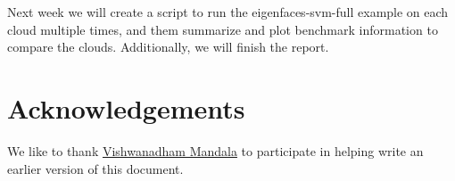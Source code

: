 Next week we will create a script to run the eigenfaces-svm-full example
on each cloud multiple times, and them summarize and plot benchmark
information to compare the clouds. Additionally, we will finish the
report.

\section*{Acknowledgements}\label{acknowledgements}

We like to thank
\href{https://github.com/cybertraining-dsc/fa20-523-325/}{Vishwanadham
Mandala} to participate in helping write an earlier version of this
document.



